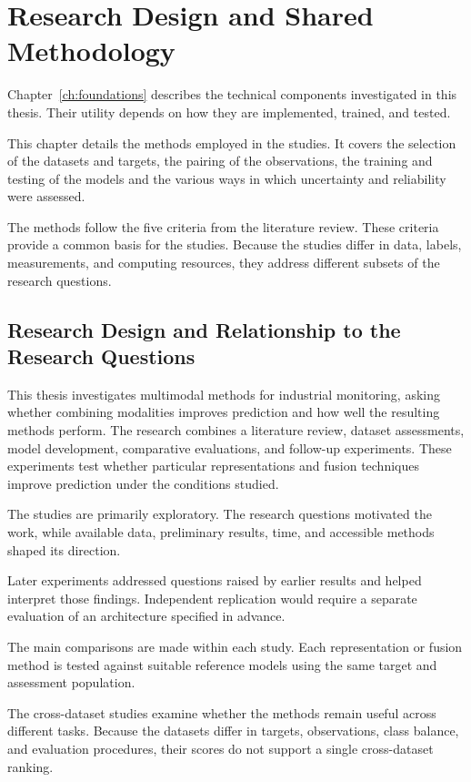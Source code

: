 \chapter{Research Design and Shared Methodology}
\label{ch:methodology}

Chapter~\ref{ch:foundations} describes the technical components investigated in this thesis. Their utility depends on how they are implemented, trained, and tested.

This chapter details the methods employed in the studies. It covers the selection of the datasets and targets, the pairing of the observations, the training and testing of the models and the various ways in which uncertainty and reliability were assessed.

The methods follow the five criteria from the literature review. These criteria provide a common basis for the studies. Because the studies differ in data, labels, measurements, and computing resources, they address different subsets of the research questions.

\section{Research Design and Relationship to the Research Questions}

This thesis investigates multimodal methods for industrial monitoring, asking whether combining modalities improves prediction and how well the resulting methods perform. The research combines a literature review, dataset assessments, model development, comparative evaluations, and follow-up experiments. These experiments test whether particular representations and fusion techniques improve prediction under the conditions studied.

The studies are primarily exploratory. The research questions motivated the work, while available data, preliminary results, time, and accessible methods shaped its direction.

Later experiments addressed questions raised by earlier results and helped interpret those findings. Independent replication would require a separate evaluation of an architecture specified in advance.

The main comparisons are made within each study. Each representation or fusion method is tested against suitable reference models using the same target and assessment population.

The cross-dataset studies examine whether the methods remain useful across different tasks. Because the datasets differ in targets, observations, class balance, and evaluation procedures, their scores do not support a single cross-dataset ranking.


